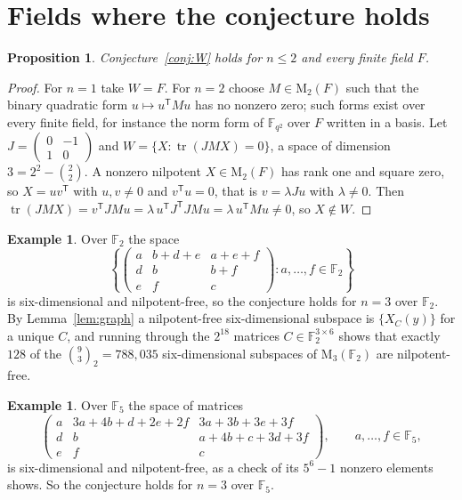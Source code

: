 \documentclass[screen]{aomart}
\newtheorem{proposition}[theorem]{Proposition}
\theoremstyle{definition}
\newtheorem{example}[theorem]{Example}
\theoremstyle{remark}
\numberwithin{equation}{section}
\newcommand{\F}{\mathbb{F}}
\newcommand{\M}{\mathrm{M}}
\newcommand{\tr}{\operatorname{tr}}
\begin{document}
\section{Fields where the conjecture holds}\label{sec:holds}

\begin{proposition}\label{prop:two}
Conjecture~\ref{conj:W} holds for $n\le2$ and every finite field $F$.
\end{proposition}

\begin{proof}
For $n=1$ take $W=F$. For $n=2$ choose $M\in\M_2(F)$ such that the binary quadratic form $u\mapsto u^{\mathsf T}Mu$ has no nonzero zero; such forms exist over every finite field, for instance the norm form of $\F_{q^2}$ over $F$ written in a basis. Let $J=\left(\begin{smallmatrix}0&-1\\1&0\end{smallmatrix}\right)$ and $W=\{X:\tr(JMX)=0\}$, a space of dimension $3=2^2-\binom22$. A nonzero nilpotent $X\in\M_2(F)$ has rank one and square zero, so $X=uv^{\mathsf T}$ with $u,v\ne0$ and $v^{\mathsf T}u=0$, that is $v=\lambda Ju$ with $\lambda\ne0$. Then $\tr(JMX)=v^{\mathsf T}JMu=\lambda\,u^{\mathsf T}J^{\mathsf T}JMu=\lambda\,u^{\mathsf T}Mu\ne0$, so $X\notin W$.
\end{proof}

\begin{example}\label{ex:F2}
Over $\F_2$ the space
\[
\left\{\begin{pmatrix} a&b+d+e&a+e+f\\ d&b&b+f\\ e&f&c\end{pmatrix} : a,\dots,f\in\F_2\right\}
\]
is six-dimensional and nilpotent-free, so the conjecture holds for $n=3$ over $\F_2$. By Lemma~\ref{lem:graph} a nilpotent-free six-dimensional subspace is $\{X_C(y)\}$ for a unique $C$, and running through the $2^{18}$ matrices $C\in\F_2^{3\times6}$ shows that exactly $128$ of the $\binom93_2=788{,}035$ six-dimensional subspaces of $\M_3(\F_2)$ are nilpotent-free.
\end{example}

\begin{example}\label{ex:F5}
Over $\F_5$ the space of matrices
\[
\begin{pmatrix} a&3a+4b+d+2e+2f&3a+3b+3e+3f\\ d&b&a+4b+c+3d+3f\\ e&f&c\end{pmatrix},\qquad a,\dots,f\in\F_5,
\]
is six-dimensional and nilpotent-free, as a check of its $5^6-1$ nonzero elements shows. So the conjecture holds for $n=3$ over $\F_5$.
\end{example}
\end{document}
